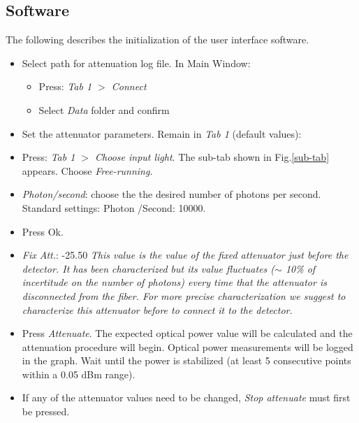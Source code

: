 \documentclass{article}
\begin{document}

\subsection{Software}



The following describes the initialization of the user interface software.

\begin{itemize}

\item
Select path for attenuation log file. In Main Window:
\begin{itemize}
\item
Press: \emph{Tab 1 $>$ Connect}
\item 
Select \emph{Data} folder and confirm
\end{itemize}

\label{sec:soft_init}

\item
Set the attenuator parameters. Remain in \emph{Tab 1} (default values):
\end{itemize}

\begin{itemize}
\item
Press: \emph{Tab 1 $>$ Choose input light}. The sub-tab shown in Fig.\ref{sub-tab} appears.
Choose \emph{Free-running}.
\item
\emph{Photon/second}: choose the the desired number of photons per second. Standard settings: Photon /Second: 10000.
\item
Press Ok.
\item
\emph{Fix Att.}: -25.50 {\it This value is the value of the fixed attenuator just before the detector. It has been characterized but its value fluctuates ($\sim$ 10\% of incertitude on the number of photons) every time that the attenuator is disconnected from the fiber. For more precise characterization we suggest to characterize this attenuator before to connect it to the detector.}
\item
Press \emph{Attenuate}. The expected optical power value will be calculated and the attenuation procedure will begin. Optical power measurements will be logged in the graph. Wait until the power is stabilized (at least 5 consecutive points within a 0.05 dBm range).
\item
If any of the attenuator values need to be changed, \emph{Stop attenuate} must first be pressed. 

\end{itemize}
\end{document}
